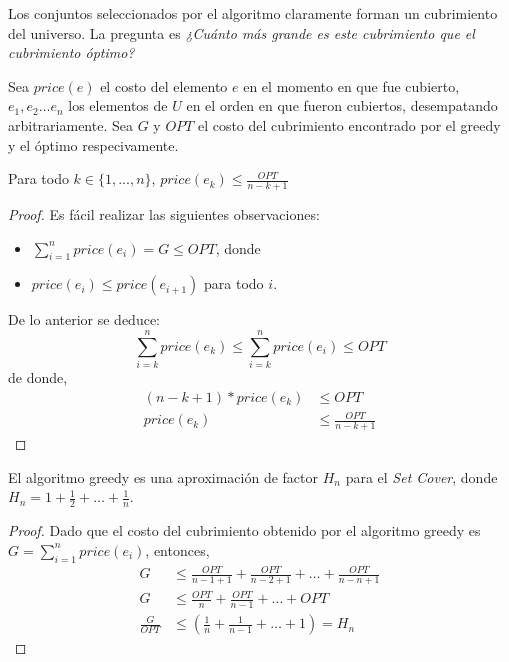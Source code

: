\documentclass[../np-approximations.tex]{subfiles}
\begin{document}
Los conjuntos seleccionados por el algoritmo claramente forman un 
cubrimiento del universo. La pregunta es \emph{¿Cuánto más grande 
es este cubrimiento que el cubrimiento óptimo?}
    
Sea $price(e)$ el costo del elemento $e$ en el momento en que fue
cubierto, $e_1, e_2 \dots e_n$ los elementos de $U$ en el orden
en que fueron cubiertos, desempatando arbitrariamente. Sea $G$ y
$OPT$ el costo del cubrimiento encontrado por el greedy y el
óptimo respecivamente.
    
\begin{lemma}
	Para todo $k \in \{1, ..., n\}$,
	$price(e_k) \le \frac{OPT}{n-k+1}$
\end{lemma}
    
\begin{proof}
	Es fácil realizar las siguientes observaciones:
	\begin{itemize}
		\item $\sum_{i=1}^n price(e_i) = G \le OPT$, donde 
		\item $price(e_i) \le price(e_{i+1})$ para todo $i$.
	\end{itemize}
				
	De lo anterior se deduce:
	\begin{equation*}
		\sum_{i=k}^n price(e_k) \le \sum_{i=k}^n price(e_i) \le OPT
	\end{equation*}
	de donde,
	\begin{equation*}
		\begin{split}
			(n-k+1)*price(e_k) &\le OPT\\
			price(e_k) &\le \frac{OPT}{n-k+1}
		\end{split}
	\end{equation*}
\end{proof}
    
\begin{theorem}
	El algoritmo greedy es una aproximación de factor $H_n$
	para el \emph{Set Cover}, donde $H_n = 1 + \frac{1}{2} +
	\dots + \frac{1}{n}$.
\end{theorem}
    
\begin{proof}
	Dado que el costo del cubrimiento obtenido por el algoritmo 
	greedy es $G = \sum_{i=1}^n price(e_i)$, entonces,
	\begin{equation*}
		\begin{split}
			G &\le \frac{OPT}{n-1+1} + \frac{OPT}{n-2+1} + \dots +
			\frac{OPT}{n-n+1} \\
			G &\le \frac{OPT}{n} + \frac{OPT}{n-1} + \dots + OPT\\
			\frac{G}{OPT} &\le (\frac{1}{n} + \frac{1}{n-1} +
			\dots + 1) = H_n
		\end{split}
	\end{equation*}
\end{proof}
\end{document}
